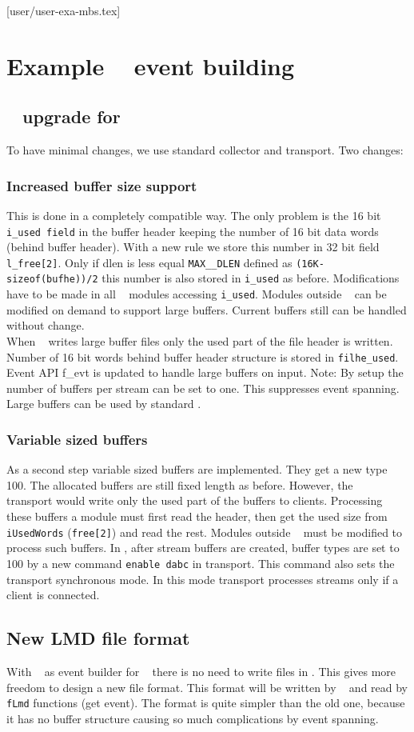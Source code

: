 [user/user-exa-mbs.tex]
\section{Example \mbs~ event building}
\subsection{\mbs~ upgrade for \dabc}
To have minimal changes, we use standard collector and transport. Two changes:
\subsubsection{Increased buffer size support}
This is done in a completely compatible way. The only problem is the 16 bit {\tt i\_used field} in the buffer header keeping the number of 16 bit data words (behind buffer header). With a new rule we store this number in 32 bit field {\tt l\_free[2]}. Only if dlen is less equal {\tt MAX\_\_DLEN} defined as {\tt (16K-sizeof(bufhe))/2} this number is also stored in {\tt i\_used} as before. Modifications have to be made in all \mbs~ modules accessing {\tt i\_used}. Modules outside \mbs~ can be modified on demand to support large buffers. Current buffers still can be handled without change.\\
When \mbs~ writes large buffer files only the used part of the file header is written. Number of 16 bit words behind buffer header structure is stored in {\tt filhe\_used}.
Event API f\_evt is updated to handle large buffers on input.
Note: By setup the number of buffers per stream can be set to one. This suppresses event spanning.
Large buffers can be used by standard \mbs.
\subsubsection{Variable sized buffers}
As a second step variable sized buffers are implemented. They get a new type 100. The allocated buffers are still fixed length as before. However, the \mbs~ transport would write only the used part of the buffers to clients. Processing these buffers a module must first read the header, then get the used size from {\tt iUsedWords} ({\tt free[2]}) and read the rest. Modules outside \mbs~ must be modified to process such buffers.
In \mbs, after stream buffers are created, buffer types are set to 100 by a new command {\tt enable dabc} in transport. This command also sets the transport synchronous mode. In this mode transport processes streams only if a client is connected.
\subsection{New LMD file format}
With \dabc~ as event builder for \mbs~ there is no need to write files in \mbs. This gives more freedom to design a new file format. This format will be written by \dabc~ and read by {\tt fLmd} functions (get event). The format is quite simpler than the old one, because it has no buffer structure causing so much complications by event spanning.

